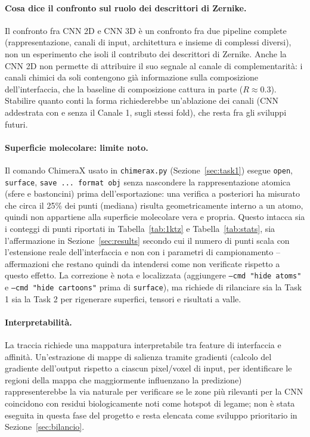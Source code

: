 \documentclass[11pt,a4paper]{article}
\begin{document}
\paragraph{Cosa dice il confronto sul ruolo dei descrittori di Zernike.} Il confronto fra CNN 2D e CNN 3D è un confronto fra due pipeline complete (rappresentazione, canali di input, architettura e insieme di complessi diversi), non un esperimento che isoli il contributo dei descrittori di Zernike. Anche la CNN 2D non permette di attribuire il suo segnale al canale di complementarità: i canali chimici da soli contengono già informazione sulla composizione dell'interfaccia, che la baseline di composizione cattura in parte ($R \approx 0.3$). Stabilire quanto conti la forma richiederebbe un'ablazione dei canali (CNN addestrata con e senza il Canale 1, sugli stessi fold), che resta fra gli sviluppi futuri.

\paragraph{Superficie molecolare: limite noto.} Il comando ChimeraX usato in \texttt{chimerax.py} (Sezione~\ref{sec:task1}) esegue \texttt{open}, \texttt{surface}, \texttt{save ... format obj} senza nascondere la rappresentazione atomica (sfere e bastoncini) prima dell'esportazione: una verifica a posteriori ha misurato che circa il 25\% dei punti (mediana) risulta geometricamente interno a un atomo, quindi non appartiene alla superficie molecolare vera e propria. Questo intacca sia i conteggi di punti riportati in Tabella~\ref{tab:1ktz} e Tabella~\ref{tab:stats}, sia l'affermazione in Sezione~\ref{sec:results} secondo cui il numero di punti scala con l'estensione reale dell'interfaccia e non con i parametri di campionamento -- affermazioni che restano quindi da intendersi come non verificate rispetto a questo effetto. La correzione è nota e localizzata (aggiungere \texttt{--cmd "hide atoms"} e \texttt{--cmd "hide cartoons"} prima di \texttt{surface}), ma richiede di rilanciare sia la Task 1 sia la Task 2 per rigenerare superfici, tensori e risultati a valle.

\paragraph{Interpretabilità.} La traccia richiede una mappatura interpretabile tra feature di interfaccia e affinità. Un'estrazione di mappe di salienza tramite gradienti (calcolo del gradiente dell'output rispetto a ciascun pixel/voxel di input, per identificare le regioni della mappa che maggiormente influenzano la predizione) rappresenterebbe la via naturale per verificare se le zone più rilevanti per la CNN coincidono con residui biologicamente noti come hotspot di legame; non è stata eseguita in questa fase del progetto e resta elencata come sviluppo prioritario in Sezione~\ref{sec:bilancio}.
\end{document}
